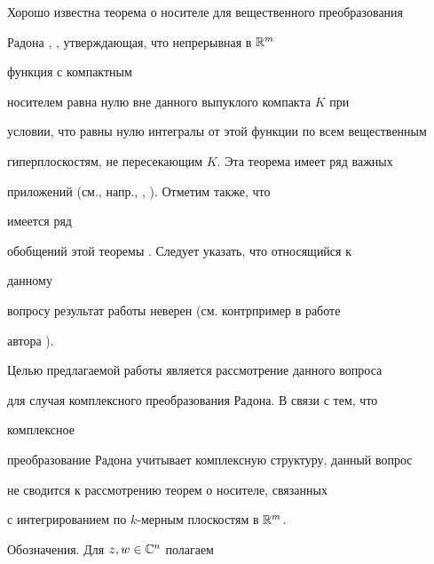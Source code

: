  




 


\maketitle 


 




 


 


Хорошо известна теорема о носителе для вещественного преобразования 


Радона \cite{Hel}, \cite{Lud}, утверждающая, что непрерывная в $\Bbb R^m$ 


функция с компактным 


носителем равна нулю вне данного выпуклого компакта $K$ при 


условии, что равны нулю интегралы от этой функции по всем вещественным 


гиперплоскостям, не пересекающим $K$. Эта теорема имеет ряд важных 


приложений (см., напр., \cite{Lud}, \cite{Wi1}). Отметим также, что 


имеется ряд 


обобщений этой теоремы \cite{Bom}. Следует указать, что относящийся к 


данному 


вопросу результат работы \cite{Wi2} неверен (см. контрпример в работе 


автора \cite{Sek}). 


 


Целью предлагаемой работы является рассмотрение данного вопроса 


для случая комплексного преобразования Радона. В связи с тем, что 


комплексное 


преобразование Радона учитывает комплексную структуру, данный вопрос 


не сводится к рассмотрению теорем о носителе, связанных 


с интегрированием по $k$-мерным плоскостям в $\Bbb R^m$. 


 


Обозначения. Для $z,w\in\Bbb C^n$ полагаем 


